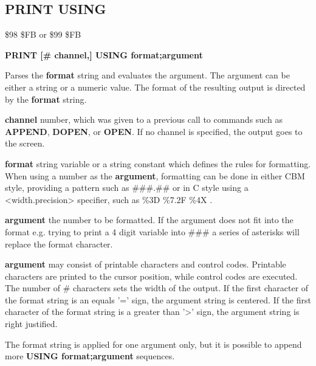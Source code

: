 \subsection{PRINT USING}
\begin{description}[leftmargin=2cm,style=nextline]
\item [Token:] \$98 \$FB or \$99 \$FB
\item [Format:] {\bf PRINT [\# channel,] USING format;argument}
\item [Usage:]  Parses the {\bf format} string and evaluates the argument.
                The argument can be either a string or a numeric value.
                The format of the resulting output is directed
                by the {\bf format} string.

                {\bf channel} number, which was given to a previous
                call to commands such as {\bf APPEND}, {\bf DOPEN}, or {\bf OPEN}.
                If no channel is specified, the output goes to the screen.

                {\bf format} string variable or a string constant
                which defines the rules for formatting.
                When using a number as the {\bf argument}, formatting can be done in either
                CBM style, providing a pattern such as {\ttfamily \#\#\#.\#\#}
                or in C style using a <width.precision> specifier, such as {\ttfamily \%3D \%7.2F \%4X }.

                {\bf argument} the number to be formatted. If the argument does not fit into the format
                e.g. trying to print a 4 digit variable into {\ttfamily \#\#\#}
                a series of asterisks will replace the format character.

                {\bf argument} may consist of printable
                characters and control codes. Printable characters
                are printed to the cursor position, while control
                codes are executed.
                The number of {\ttfamily \#} characters sets the width of the output.
                If the first character of the format string
                is an equals '=' sign, the argument string is centered.
                If the first character of the format string
                is a greater than '>' sign, the argument string is right justified.

\item [Remarks:] The format string is applied for one argument only,
                 but it is possible to append more
                 {\bf USING format;argument} sequences.



\end{description}
